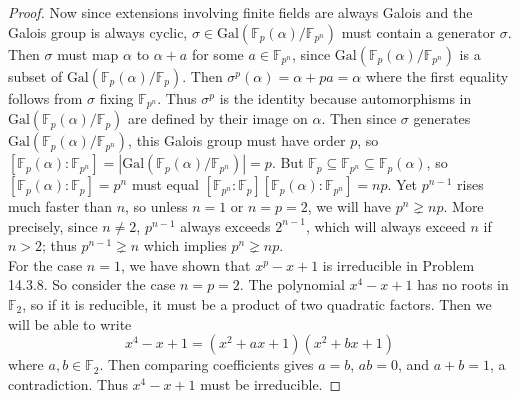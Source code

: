 \documentclass{article}
\begin{document}
\begin{proof}
    Now since extensions involving finite fields are always Galois and the
    Galois group is always cyclic,
    $\sigma\in\text{Gal}(\mathbb{F}_p(\alpha)/\mathbb{F}_{p^n})$ must
    contain a generator $\sigma$. Then $\sigma$ must map
    $\alpha$ to $\alpha+a$ for some $a\in\mathbb{F}_{p^n}$, since
    $\text{Gal}(\mathbb{F}_p(\alpha)/\mathbb{F}_{p^n})$ is a subset of
    $\text{Gal}(\mathbb{F}_p(\alpha)/\mathbb{F}_{p})$. Then
    $\sigma^p(\alpha)=\alpha+pa=\alpha$ where the first equality follows
    from $\sigma$ fixing $\mathbb{F}_{p^n}$. Thus $\sigma^p$ is the
    identity because automorphisms in
    $\text{Gal}(\mathbb{F}_p(\alpha)/\mathbb{F}_p)$ are defined by their
    image on $\alpha$. Then since $\sigma$ generates
    $\text{Gal}(\mathbb{F}_p(\alpha)/\mathbb{F}_{p^n})$, this Galois group
    must have order $p$, so $[\mathbb{F}_p(\alpha):\mathbb{F}_{p^n}]
    =|\text{Gal}(\mathbb{F}_p(\alpha)/\mathbb{F}_{p^n})|=p$. But
    $\mathbb{F}_p\subseteq\mathbb{F}_{p^n}\subseteq\mathbb{F}_p(\alpha)$,
    so $[\mathbb{F}_{p}(\alpha):\mathbb{F}_p]=p^n$ must equal
    $[\mathbb{F}_{p^n}:\mathbb{F}_p]
    [\mathbb{F}_{p}(\alpha):\mathbb{F}_{p^n}]=np$. Yet $p^{n-1}$ rises much
    faster than $n$, so unless $n=1$ or
    $n=p=2$, we will have $p^n\gneq np$. More precisely, since $n\neq2$,
    $p^{n-1}$ always exceeds $2^{n-1}$, which will always exceed $n$ if
    $n>2$; thus $p^{n-1}\gneq n$ which implies $p^n\gneq np$. \\

    For the case $n=1$, we have shown that $x^p-x+1$ is irreducible in
    Problem 14.3.8. So consider the case $n=p=2$. The polynomial $x^4-x+1$
    has no roots in $\mathbb{F}_2$, so if it is reducible, it must be a
    product of two quadratic factors. Then we will be able to write
    \[x^4-x+1 =(x^2+ax+1)(x^2+bx+1)\]
    where $a,b\in\mathbb{F}_2$. Then comparing coefficients gives
    $a=b$, $ab=0$, and $a+b=1$, a contradiction. Thus $x^4-x+1$ must be
    irreducible.
  \end{proof}
\end{document}
